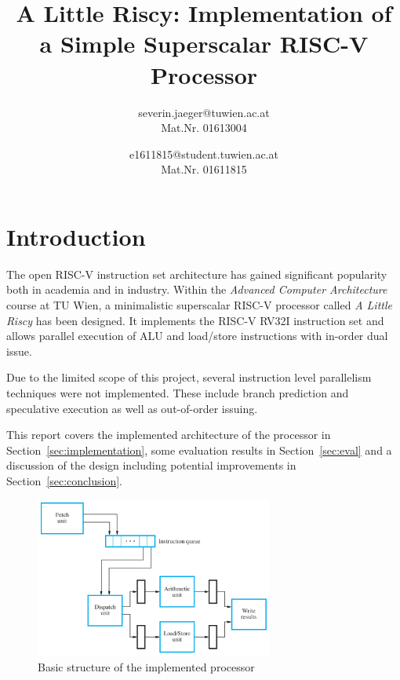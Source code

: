 \documentclass[conference]{IEEEtran}
\begin{document}
\title{A Little Riscy: Implementation of a Simple Superscalar RISC-V Processor
}

\author{
severin.jaeger@tuwien.ac.at\\
Mat.Nr. 01613004\\

\and
{}
e1611815@student.tuwien.ac.at\\
Mat.Nr. 01611815\\
}

\maketitle

\begin{abstract}
\end{abstract}

\section{Introduction}
The open RISC-V instruction set architecture has gained significant popularity both in academia and in industry. Within the \emph{Advanced Computer Architecture} course at TU Wien, a minimalistic superscalar RISC-V processor called \emph{A Little Riscy} has been designed. It implements the RISC-V RV32I instruction set and allows parallel execution of ALU and load/store instructions with in-order dual issue.

Due to the limited scope of this project, several instruction level parallelism techniques were not implemented. These include branch prediction and speculative execution as well as out-of-order issuing.

This report covers the implemented architecture of the processor in Section~\ref{sec:implementation}, some evaluation results in Section~\ref{sec:eval} and a discussion of the design including potential improvements in Section~\ref{sec:conclusion}.

\begin{figure} [ht]
	\centering
	\includegraphics[width=7.8cm]{basic_architecture.PNG}
	\caption{Basic structure of the implemented processor \cite{Hamacher}}
	\label{fig:basic_arch}
\end{figure}
\end{document}
